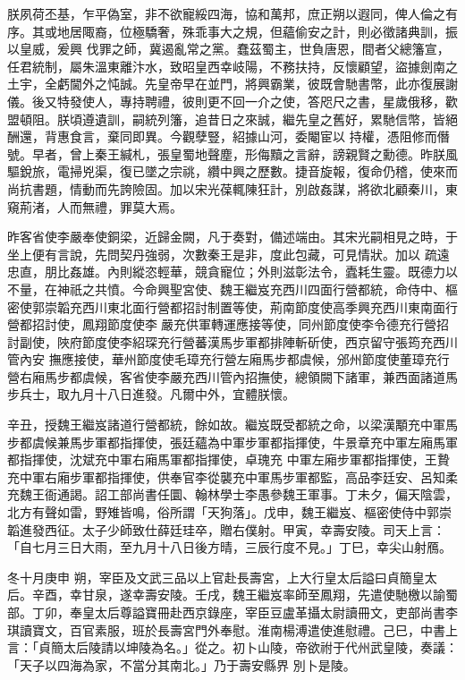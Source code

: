 \begin{pinyinscope}
 朕夙荷丕基，乍平偽室，非不欲寵綏四海，協和萬邦，庶正朔以遐同，俾人倫之有序。其或地居陬裔，位極驕奢，殊乖事大之規，但蘊偷安之計，則必徵諸典訓，振以皇威，爰興
 伐罪之師，冀遏亂常之黨。蠢茲蜀主，世負唐恩，間者父總籓宣，任君統制，屬朱溫東離汴水，致昭皇西幸岐陽，不務扶持，反懷顧望，盜據劍南之土宇，全虧閫外之忳誠。先皇帝早在並門，將興霸業，彼既會馳書幣，此亦復展謝儀。後又特發使人，專持聘禮，彼則更不回一介之使，答咫尺之書，星歲俄移，歡盟頓阻。朕頃遵遺訓，嗣統列籓，追昔日之來誠，繼先皇之舊好，累馳信幣，皆絕酬還，背惠食言，棄同即異。今觀孽豎，紹據山河，委閹宦以
 持權，憑阻修而僭號。早者，曾上秦王緘札，張皇蜀地聲塵，形侮黷之言辭，謗親賢之勳德。昨朕風驅銳旅，電掃兇渠，復已墜之宗祧，纘中興之歷數。捷音旋報，復命仍稽，使來而尚抗書題，情動而先誇險固。加以宋光葆輒陳狂計，別啟姦謀，將欲北顧秦川，東窺荊渚，人而無禮，罪莫大焉。



 昨客省使李嚴奉使銅梁，近歸金闕，凡于奏對，備述端由。其宋光嗣相見之時，于坐上便有言說，先問契丹強弱，次數秦王是非，度此包藏，可見情狀。加以
 疏遠忠直，朋比姦雄。內則縱恣輕華，競貪寵位；外則滋彰法令，蠹耗生靈。既德力以不量，在神祇之共憤。今命興聖宮使、魏王繼岌充西川四面行營都統，命侍中、樞密使郭崇韜充西川東北面行營都招討制置等使，荊南節度使高季興充西川東南面行營都招討使，鳳翔節度使李嚴充供軍轉運應接等使，同州節度使李令德充行營招討副使，陜府節度使李紹琛充行營蕃漢馬步軍都排陣斬斫使，西京留守張筠充西川管內安
 撫應接使，華州節度使毛璋充行營左廂馬步都虞候，邠州節度使董璋充行營右廂馬步都虞候，客省使李嚴充西川管內招撫使，總領闕下諸軍，兼西面諸道馬步兵士，取九月十八日進發。凡爾中外，宜體朕懷。



 辛丑，授魏王繼岌諸道行營都統，餘如故。繼岌既受都統之命，以梁漢顒充中軍馬步都虞候兼馬步軍都指揮使，張廷蘊為中軍步軍都指揮使，牛景章充中軍左廂馬軍都指揮使，沈斌充中軍右廂馬軍都指揮使，卓瑰充
 中軍左廂步軍都指揮使，王贄充中軍右廂步軍都指揮使，供奉官李從襲充中軍馬步軍都監，高品李廷安、呂知柔充魏王衙通謁。詔工部尚書任圜、翰林學士李愚參魏王軍事。丁未夕，偏天陰雲，北方有聲如雷，野雉皆鳴，俗所謂「天狗落」。戊申，魏王繼岌、樞密使侍中郭崇韜進發西征。太子少師致仕薛廷珪卒，贈右僕射。甲寅，幸壽安陵。司天上言：「自七月三日大雨，至九月十八日後方晴，三辰行度不見。」丁巳，幸尖山射鴈。


冬十月庚申
 朔，宰臣及文武三品以上官赴長壽宮，上大行皇太后謚曰貞簡皇太后。辛酉，幸甘泉，遂幸壽安陵。壬戌，魏王繼岌率師至鳳翔，先遣使馳檄以諭蜀部。丁卯，奉皇太后尊謚寶冊赴西京錄座，宰臣豆盧革攝太尉讀冊文，吏部尚書李琪讀寶文，百官素服，班於長壽宮門外奉慰。淮南楊溥遣使進慰禮。己巳，中書上言：「貞簡太后陵請以坤陵為名。」從之。初卜山陵，帝欲祔于代州武皇陵，奏議：「天子以四海為家，不當分其南北。」乃于壽安縣界
 別卜是陵。



\end{pinyinscope}
